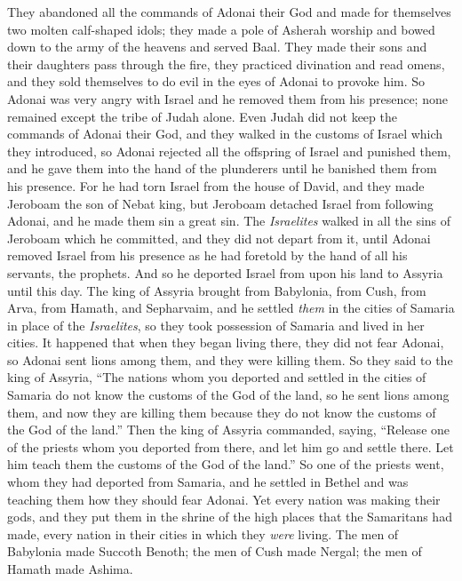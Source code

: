 \begin{biblechapter}
\verse They abandoned all the commands of Adonai their God and made for themselves two molten calf-shaped idols; they made a pole of Asherah worship and bowed down to the army of the heavens and served Baal.
\verse They made their sons and their daughters pass through the fire, they practiced divination and read omens, and they sold themselves to do evil in the eyes of Adonai to provoke him.
\verse So Adonai was very angry with Israel and he removed them from his presence; none remained except the tribe of Judah alone.
\verse Even Judah did not keep the commands of Adonai their God, and they walked in the customs of Israel which they introduced,
\verse so Adonai rejected all the offspring of Israel and punished them, and he gave them into the hand of the plunderers until he banished them from his presence.
\verse For he had torn Israel from the house of David, and they made Jeroboam the son of Nebat king, but Jeroboam detached Israel from following Adonai, and he made them sin a great sin.
\verse The \textit{Israelites} walked in all the sins of Jeroboam which he committed, and they did not depart from it,
\verse until Adonai removed Israel from his presence as he had foretold by the hand of all his servants, the prophets. And so he deported Israel from upon his land to Assyria until this day.
 The king of Assyria brought from Babylonia, from Cush, from Arva, from Hamath, and Sepharvaim, and he settled \textit{them} in the cities of Samaria in place of the \textit{Israelites}, so they took possession of Samaria and lived in her cities.
\verse It happened that when they began living there, they did not fear Adonai, so Adonai sent lions among them, and they were killing them.
\verse So they said to the king of Assyria, “The nations whom you deported and settled in the cities of Samaria do not know the customs of the God of the land, so he sent lions among them, and now they are killing them because they do not know the customs of the God of the land.”
\verse Then the king of Assyria commanded, saying, “Release one of the priests whom you deported from there, and let him go and settle there. Let him teach them the customs of the God of the land.”
\verse So one of the priests went, whom they had deported from Samaria, and he settled in Bethel and was teaching them how they should fear Adonai.
\verse Yet every nation was making their gods, and they put them in the shrine of the high places that the Samaritans had made, every nation in their cities in which they \textit{were} living.
\verse The men of Babylonia made Succoth Benoth; the men of Cush made Nergal; the men of Hamath made Ashima.

\end{biblechapter}
